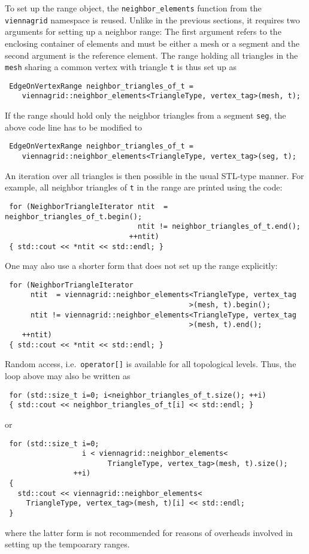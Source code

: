 To set up the range object, the \lstinline|neighbor_elements| function from the \lstinline|viennagrid| namespace is reused. Unlike in the previous sections, it requires two arguments
for setting up a neighbor range: The first argument refers to the enclosing container of elements and must be either a mesh or a segment and the second argument is the reference element.
The range holding all triangles in the \lstinline|mesh| sharing a common vertex with triangle \lstinline|t| is thus set up as
\begin{lstlisting}
 EdgeOnVertexRange neighbor_triangles_of_t =
    viennagrid::neighbor_elements<TriangleType, vertex_tag>(mesh, t);
\end{lstlisting}
If the range should hold only the neighbor triangles from a segment \lstinline|seg|, the above code line has to be modified to
\begin{lstlisting}
 EdgeOnVertexRange neighbor_triangles_of_t =
    viennagrid::neighbor_elements<TriangleType, vertex_tag>(seg, t);
\end{lstlisting}
An iteration over all triangles is then possible in the usual STL-type manner. For example, all neighbor triangles of \lstinline|t| in the range are printed using the code:
\begin{lstlisting}
 for (NeighborTriangleIterator ntit  = neighbor_triangles_of_t.begin();
                               ntit != neighbor_triangles_of_t.end();
                             ++ntit)
 { std::cout << *ntit << std::endl; }
\end{lstlisting}


One may also use a shorter form that does not set up the range explicitly:
\begin{lstlisting}
 for (NeighborTriangleIterator
      ntit  = viennagrid::neighbor_elements<TriangleType, vertex_tag
                                           >(mesh, t).begin();
      ntit != viennagrid::neighbor_elements<TriangleType, vertex_tag
                                           >(mesh, t).end();
    ++ntit)
 { std::cout << *ntit << std::endl; }
\end{lstlisting}

Random access, i.e.~\lstinline|operator[]| is available for all topological levels. Thus, the loop above may also be written as
\begin{lstlisting}
 for (std::size_t i=0; i<neighbor_triangles_of_t.size(); ++i)
 { std::cout << neighbor_triangles_of_t[i] << std::endl; }
\end{lstlisting}
or
\begin{lstlisting}
 for (std::size_t i=0;
                  i < viennagrid::neighbor_elements<
                        TriangleType, vertex_tag>(mesh, t).size();
                ++i)
 {
   std::cout << viennagrid::neighbor_elements<
     TriangleType, vertex_tag>(mesh, t)[i] << std::endl;
 }
\end{lstlisting}
where the latter form is not recommended for reasons of overheads involved in setting up the tempoarary ranges.
